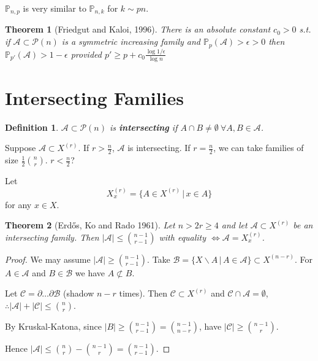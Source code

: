 \documentclass[a4paper]{article}
\newtheorem*{definition}{Definition}
\newtheorem{theorem}{Theorem}
\newcommand*\abs[1]{\left|#1\right|}
\begin{document}
$\mathbb{P}_{n, p}$ is very similar to $\mathbb{P}_{n,k}$ for $k \sim pn$.

\begin{theorem}[Friedgut and Kaloi, 1996]
	There is an absolute constant $c_0 > 0$ s.t. if $\mathcal{A} \subset \mathcal{P}(n)$ is a symmetric increasing family and $\mathbb{P}_p(\mathcal{A}) > \epsilon > 0$
	then $\mathbb{P}_{p'}(\mathcal{A}) > 1 - \epsilon$
	provided $p' \geq p + c_0 \frac{\log{1/\epsilon}}{\log{n}}$
\end{theorem}

\section{Intersecting Families}
\setcounter{theorem}{0}
\begin{definition}
	$\mathcal{A} \subset \mathcal{P}(n)$ is \textbf{intersecting} if $A \cap B \neq \emptyset\ \forall A, B \in \mathcal{A}$.
\end{definition}

Suppose $\mathcal{A} \subset X^{(r)}$.
If $r > \frac{n}{2}$, $\mathcal{A}$ is intersecting.
If $r = \frac{n}{2}$, we can take families of size $\frac{1}{2}{n \choose r}$.
$r < \frac{n}{2}$?

Let $$X_x^{(r)} = \{A \in X^{(r)} \,|\, x \in A\}$$ for any $x \in X$.

\begin{theorem}[Erd\H{o}s, Ko and Rado 1961]
	Let $n > 2r \geq 4$ and let $\mathcal{A} \subset X^{(r)}$ be an intersecting family.
	Then $\abs{\mathcal{A}} \leq {n-1 \choose r-1}$ with equality $\iff \mathcal{A} = X_x^{(r)}$.
\end{theorem}
\begin{proof}
	We may assume $\abs{\mathcal{A}} \geq {n-1 \choose r-1}$.
	Take $\mathcal{B} = \{X\backslash A \,|\, A \in \mathcal{A}\} \subset X^{(n-r)}$.
	For $A \in \mathcal{A}$ and $B \in \mathcal{B}$ we have $A \not\subset B$.
	
	Let $\mathcal{C} = \partial \dots \partial \mathcal{B}$ (shadow $n-r$ times).
	Then $\mathcal{C} \subset X^{(r)}$ and $\mathcal{C} \cap \mathcal{A} = \emptyset$,
	$\therefore \abs{\mathcal{A}} + \abs{\mathcal{C}} \leq {n \choose r}$.
	
	By Kruskal-Katona, since $\abs{B} \geq {n-1 \choose r-1} = {n-1 \choose n-r}$,
	have $\abs{\mathcal{C}} \geq {n-1 \choose r}$.
	
	Hence $\abs{\mathcal{A}} \leq {n \choose r} - {n -1 \choose r} = {n-1 \choose r-1}$.
\end{proof}
\end{document}
